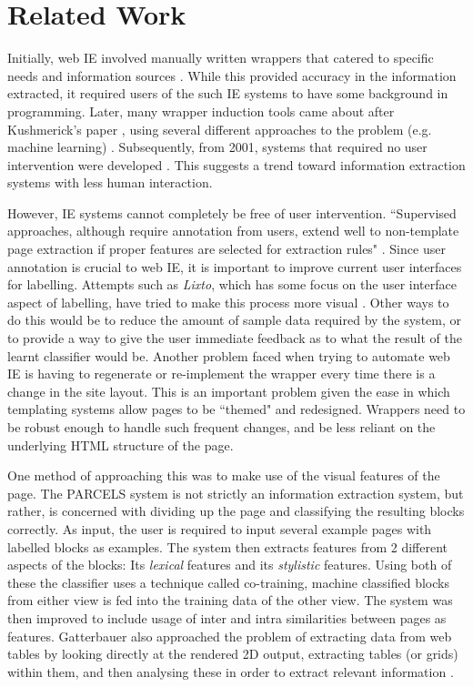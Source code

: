 \chapter{Related Work}

	Initially, web IE involved manually written wrappers that catered to specific needs and information sources \cite{Chawathe1994,Perkowitz1995} . While this provided accuracy in the information extracted, it required users of the such IE systems to have some background in programming. Later, many wrapper induction tools came about after Kushmerick's paper \cite{Kushmerick1997}, using several different approaches to the problem (e.g. machine learning) \cite{Freitag1998,Soderland}. Subsequently, from 2001, systems that required no user intervention were developed \cite{Chang2001,Crescenzi2002,Arasu2003}. This suggests a trend toward information extraction systems with less human interaction.
	
	However, IE systems cannot completely be free of user intervention. ``Supervised approaches, although require annotation from users, extend well to non-template page extraction if proper features are selected for extraction rules" \cite{Kayed2006}. Since user annotation is crucial to web IE, it is important to improve current user interfaces for labelling. Attempts such as \textit{Lixto}, which has some focus on the user interface aspect of labelling, have tried to make this process more visual \cite{Baumgartner2001}. Other ways to do this would be to reduce the amount of sample data required by the system, or to provide a way to give the user immediate feedback as to what the result of the learnt classifier would be.
	Another problem faced when trying to automate web IE is having to regenerate or re-implement the wrapper every time there is a change in the site layout. This is an important problem given the ease in which templating systems allow pages to be ``themed" and redesigned. Wrappers need to be robust enough to handle such frequent changes, and be less reliant on the underlying HTML structure of the page.
	
	One method of approaching this was to make use of the visual features of the page. The PARCELS system is not strictly an information extraction system, but rather, is concerned with dividing up the page and classifying the resulting blocks correctly. As input, the user is required to input several example pages with labelled blocks as examples. The system then extracts features from 2 different aspects of the blocks: Its \textit{lexical} features and its \textit{stylistic} features. Using both of these the classifier uses a technique called co-training, machine classified blocks from either view is fed into the training data of the other view\cite{Lee2004}. The system was then improved to include usage of inter and intra similarities between pages as features\cite{AikMiang2005}. Gatterbauer also approached the problem of extracting data from web tables by looking directly at the rendered 2D output, extracting tables (or grids) within them, and then analysing these in order to extract relevant information \cite{Gatterbauer2007}.
	

